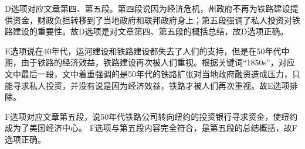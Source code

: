 \begin{blk}
\begin{nlz}
        D选项对应文章第四、第五段。第四段说因为经济危机，州政府不再为铁路建设提供资金，财政负担转移到了当地政府和联邦政府身上；第五段强调了私人投资对铁路建设的重要性。故D选项是对文章第四、第五段的概括总结，故D选项正确。

        E选项说在40年代，运河建设和铁路建设都失去了人们的支持，但是在50年代中期，由于铁路的经济效益，铁路建设再次被人们重视。根据关键词“1850s”，对应文中最后一段，文中着重强调的是50年代的铁路扩张对当地政府融资造成压力，只能寻求私人投资，并没有说是因为经济效益，铁路才被人们再次重视。故E选项排除。

        F选项对应文章第五段，说50年代铁路公司转向纽约的投资银行寻求资金，使纽约成为了美国经济中心。
        F选项与第五段内容完全符合，是第五段的总结概括，故F选项正确。
    \end{nlz}
\end{blk}
